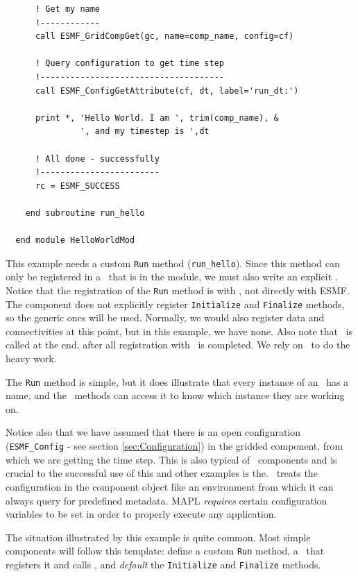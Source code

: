 \begin{verbatim}
      ! Get my name
      !------------
      call ESMF_GridCompGet(gc, name=comp_name, config=cf)

      ! Query configuration to get time step
      !-------------------------------------
      call ESMF_ConfigGetAttribute(cf, dt, label='run_dt:')

      print *, 'Hello World. I am ', trim(comp_name), &
               ', and my timestep is ',dt

      ! All done - successfully
      !------------------------
      rc = ESMF_SUCCESS

    end subroutine run_hello

  end module HelloWorldMod
\end{verbatim}
\normalsize


This example needs a custom \texttt{Run} method (\texttt{run\_hello}).
Since this method can only be registered in a \ssv\
that is in the module, we must also write an explicit \ssv.
Notice that the registration of the \texttt{Run} method is with \ggn ,
not directly with ESMF. 
The component does not explicitly register \texttt{Initialize} and
\texttt{Finalize} methods, so the generic ones will be used. Normally,
we would also register data and
connectivities at this point, but in this example, we have none.
Also note that \gssv\  is called at the end, after all registration
with \ggn\ is completed. We rely on \gssv\ to do the heavy work. 

The \texttt{Run} method is simple, but it does illustrate that every
instance of an \egc\  has a name, and the \IRF\ methods can access it to
know which instance they are working on.


Notice also that we have assumed that there is an 
open configuration (\texttt{ESMF\_Config} - see section \ref{sec:Configuration})
in the gridded component, from which we are 
getting the time step. This is also typical of \ggn\ components and is
crucial to the successful use of this and other examples is the.
\ggn\ treats the configuration in the component object like an
environment from which it can always query for predefined
metadata. MAPL \emph{requires} certain configuration variables to be set
in order to properly execute any application.

The situation illustrated by this example is quite common. Most simple
components will follow this template: define a custom \texttt{Run} method,
a \ssv\  that registers it and calls \gssv, and
\emph{default} the \texttt{Initialize} and \texttt{Finalize} methods.




